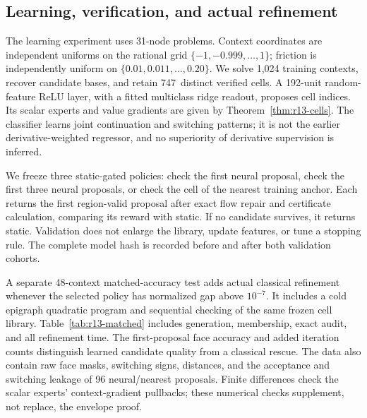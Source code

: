\documentclass[11pt,letterpaper]{article}
\theoremstyle{definition}
\newcommand{\1}{\mathbf 1}
\newcommand{\RThirteenCells}{747}
\begin{document}
\subsection{Learning, verification, and actual refinement}
The learning experiment uses 31-node problems. Context coordinates are independent uniforms on the rational grid $\{-1,-0.999,\ldots,1\}$; friction is independently uniform on $\{0.01,0.011,\ldots,0.20\}$. We solve 1,024 training contexts, recover candidate bases, and retain \RThirteenCells\ distinct verified cells. A 192-unit random-feature ReLU layer, with a fitted multiclass ridge readout, proposes cell indices. Its scalar experts and value gradients are given by Theorem~\ref{thm:r13-cells}. The classifier learns joint continuation and switching patterns; it is not the earlier derivative-weighted regressor, and no superiority of derivative supervision is inferred.

We freeze three static-gated policies: check the first neural proposal, check the first three neural proposals, or check the cell of the nearest training anchor. Each returns the first region-valid proposal after exact flow repair and certificate calculation, comparing its reward with static. If no candidate survives, it returns static. Validation does not enlarge the library, update features, or tune a stopping rule. The complete model hash is recorded before and after both validation cohorts.

A separate 48-context matched-accuracy test adds actual classical refinement whenever the selected policy has normalized gap above $10^{-7}$. It includes a cold epigraph quadratic program and sequential checking of the same frozen cell library. Table~\ref{tab:r13-matched} includes generation, membership, exact audit, and all refinement time. The first-proposal face accuracy and added iteration counts distinguish learned candidate quality from a classical rescue. The data also contain raw face masks, switching signs, distances, and the acceptance and switching leakage of 96 neural/nearest proposals. Finite differences check the scalar experts' context-gradient pullbacks; these numerical checks supplement, not replace, the envelope proof.
\end{document}
